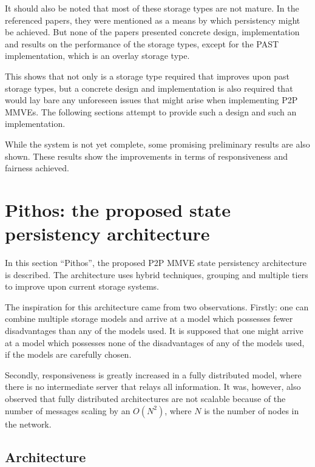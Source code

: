 \documentclass[10pt,a4paper,conference]{IEEEtran}
\begin{document}
It should also be noted that most of these storage types are not mature. In the referenced papers, they were mentioned as a means by which
persistency might be achieved. But none of the papers presented concrete design, implementation and results on the performance of the storage types,
except for the PAST implementation, which is an overlay storage type.

This shows that not only is a storage type required that improves upon past storage types, but a concrete design and implementation is also required
that would lay bare any unforeseen issues that might arise when implementing P2P MMVEs. The following sections attempt to provide such a design and
such an implementation.

While the system is not yet complete, some promising preliminary results are also shown. These results show the improvements in terms of
responsiveness and fairness achieved.

\section{Pithos: the proposed state persistency architecture}
\label{proposed_model}

In this section ``Pithos'', the proposed P2P MMVE state persistency architecture is described. The architecture uses hybrid techniques, grouping and
multiple tiers to improve upon current storage systems.

The inspiration for this architecture came from two observations. Firstly: one can combine multiple storage models and arrive at a model which
possesses fewer disadvantages than any of the models used. It is supposed that one might arrive at a model which possesses none of the disadvantages
of any of the models used, if the models are carefully chosen.

Secondly, responsiveness is greatly increased in a fully distributed model, where there is no intermediate server that relays all information. It
was, however, also observed that fully distributed architectures are not scalable because of the number of messages scaling by an $O(N^2)$, where $N$
is the number of nodes in the network.

\subsection{Architecture}
\end{document}

